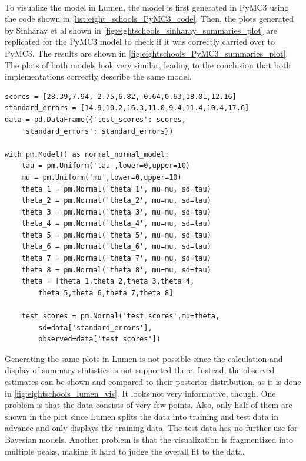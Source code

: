 \documentclass{article}
\begin{document}
\\
To visualize the model in Lumen, the model is first generated in PyMC3 using the code shown in \autoref{list:eight_schools_PyMC3_code}. Then, the plots generated by Sinharay et al shown in \autoref{fig:eightschools_sinharay_summaries_plot} are replicated for the PyMC3 model to check if it was correctly carried over to PyMC3. The results are shown in \autoref{fig:eightschools_PyMC3_summaries_plot}. The plots of both models look very similar, leading to the conclusion that both implementations correctly describe the same model.\\
\begin{minipage}{\linewidth}
\begin{lstlisting}[caption={PyMC3 model of the eight schools example}, label={list:eight_schools_PyMC3_code},captionpos=b]
scores = [28.39,7.94,-2.75,6.82,-0.64,0.63,18.01,12.16]
standard_errors = [14.9,10.2,16.3,11.0,9.4,11.4,10.4,17.6]
data = pd.DataFrame({'test_scores': scores, 
    'standard_errors': standard_errors})

with pm.Model() as normal_normal_model:
    tau = pm.Uniform('tau',lower=0,upper=10)
    mu = pm.Uniform('mu',lower=0,upper=10)
    theta_1 = pm.Normal('theta_1', mu=mu, sd=tau)
    theta_2 = pm.Normal('theta_2', mu=mu, sd=tau)
    theta_3 = pm.Normal('theta_3', mu=mu, sd=tau)
    theta_4 = pm.Normal('theta_4', mu=mu, sd=tau)
    theta_5 = pm.Normal('theta_5', mu=mu, sd=tau)
    theta_6 = pm.Normal('theta_6', mu=mu, sd=tau)
    theta_7 = pm.Normal('theta_7', mu=mu, sd=tau)
    theta_8 = pm.Normal('theta_8', mu=mu, sd=tau)
    theta = [theta_1,theta_2,theta_3,theta_4,
        theta_5,theta_6,theta_7,theta_8]

    test_scores = pm.Normal('test_scores',mu=theta,
        sd=data['standard_errors'], 
        observed=data['test_scores'])
\end{lstlisting}
\end{minipage}
Generating the same plots in Lumen is not possible since the calculation and display of summary statistics is not supported there. Instead, the observed estimates can be shown and compared to their posterior distribution, as it is done in \autoref{fig:eightschools_lumen_vis}. It looks not very informative, though. One problem is that the data consists of very few points. Also, only half of them are shown in the plot since Lumen splits the data into training and test data in advance and only displays the training data. The test data has no further use for Bayesian models. Another problem is that the visualization is fragmentized into multiple peaks, making it hard to judge the overall fit to the data.
\end{document}
